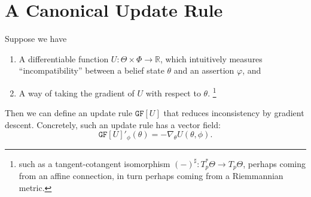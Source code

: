 \documentclass{article}
\begin{document}
%

\section{A Canonical Update Rule}
Suppose we have
\begin{enumerate}[nosep]
    \item A differentiable function $U : \Theta \times \Phi  \to \mathbb R$, which intuitively measures ``incompatibility'' between a belief state $\theta$ and an assertion $\varphi$, and
    \item
        A way of taking the gradient of $U$ with respect to $\theta$.%
            \footnote{
            such as a tangent-cotangent isomorphism $(-)^\sharp : T^*_p\Theta \to T_p \Theta$, perhaps coming from an affine connection, in turn perhaps coming from a Riemmannian metric.}
\end{enumerate}
\def\GD#1{\mathtt{GF}[#1]}
\def\NGD#1{\mathtt{NGF}[#1]}

Then we can define an update rule $\GD U$ that reduces inconsistency by gradient descent. Concretely, such an update rule has a vector field:
\[
    \GD U'_\phi(\theta) = - \nabla_\theta U(\theta,\phi).
\]
\end{document}
